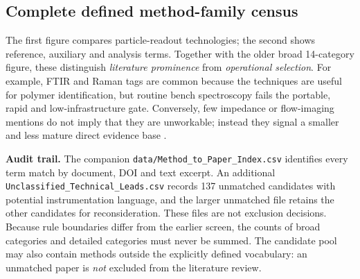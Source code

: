 \documentclass[10pt,a4paper]{article}
\begin{document}
\subsection{Complete defined method-family census}

The first figure compares particle-readout technologies; the second shows reference, auxiliary and analysis terms. Together with the older broad 14-category figure, these distinguish \emph{literature prominence} from \emph{operational selection}. For example, FTIR and Raman tags are common because the techniques are useful for polymer identification, but routine bench spectroscopy fails the portable, rapid and low-infrastructure gate. Conversely, few impedance or flow-imaging mentions do not imply that they are unworkable; instead they signal a smaller and less mature direct evidence base \cite{Blevins2021,Lee2022,Kim2024,Warraich2025}.


\noindent\textbf{Audit trail.} The companion \texttt{data/Method\_to\_Paper\_Index.csv} identifies every term match by document, DOI and text excerpt. An additional \texttt{Unclassified\_Technical\_Leads.csv} records 137 unmatched candidates with potential instrumentation language, and the larger unmatched file retains the other candidates for reconsideration. These files are not exclusion decisions. Because rule boundaries differ from the earlier screen, the counts of broad categories and detailed categories must never be summed. The candidate pool may also contain methods outside the explicitly defined vocabulary: an unmatched paper is \emph{not} excluded from the literature review.

\clearpage
\end{document}
